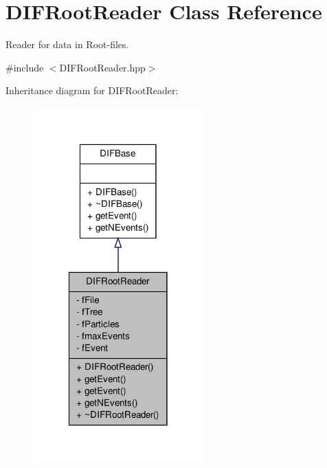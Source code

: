 \hypertarget{classDIFRootReader}{
\section{DIFRootReader Class Reference}
\label{dc/ddc/classDIFRootReader}
}


Reader for data in Root-\/files.  




{\ttfamily \#include $<$DIFRootReader.hpp$>$}



Inheritance diagram for DIFRootReader:\nopagebreak
\begin{figure}[H]
\begin{center}
\leavevmode
\includegraphics[width=186pt]{dc/db8/classDIFRootReader__inherit__graph}
\end{center}
\end{figure}


